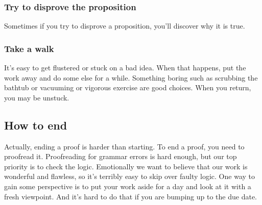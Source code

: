 \documentclass[12pt,fleqn]{article}
\newcounter{ex}\setcounter{ex}{0}
\newcounter{id}\setcounter{id}{0}
\newcounter{se}\setcounter{se}{0}
\begin{document}
\subsubsection{Try to disprove the proposition} 
 
 Sometimes if you try to disprove a proposition, you'll discover why
 it is true.
 
 \subsubsection{Take a walk}  It's easy to get flustered or stuck on a bad idea.  When that happens,
 put the work away and do some else for a while. Something boring such as
 scrubbing the bathtub or vacuuming or vigorous exercise are good choices.
  When you return, you may be unstuck.

\subsection{How to end}

Actually, ending a proof is harder than starting. To end a proof, you need to proofread it.  Proofreading for grammar 
errors is hard enough, but our top priority is to check the logic. Emotionally we want to believe that our work is wonderful
and flawless, so it's terribly easy to skip over faulty logic.  One way to gain some perspective is to put your work aside for 
a day and look at it with a fresh viewpoint.  And it's hard to do that if you are bumping up to the due date.
\end{document}

